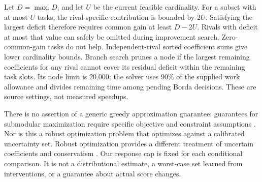 \documentclass{article}
\begin{document}
Let $D=\max_iD_i$ and let $U$ be the current feasible cardinality. For a subset with at most $U$ tasks, the rival-specific contribution is bounded by $2U$. Satisfying the largest deficit therefore requires common gain at least $D-2U$. Rivals with deficit at most that value can safely be omitted during improvement search. Zero-common-gain tasks do not help. Independent-rival sorted coefficient sums give lower cardinality bounds. Branch search prunes a node if the largest remaining coefficients for any rival cannot cover its residual deficit within the remaining task slots. Its node limit is 20,000; the solver uses 90\% of the supplied work allowance and divides remaining time among pending Borda decisions. These are source settings, not measured speedups.

There is no assertion of a generic greedy approximation guarantee: guarantees for submodular maximization require specific objective and constraint assumptions \citep{Nemhauser1978Submodular}. Nor is this a robust optimization problem that optimizes against a calibrated uncertainty set. Robust optimization provides a different treatment of uncertain coefficients and conservatism \citep{BenTal1998Robust,Bertsimas2004Price,Bertsimas2011Theory}. Our response cap is fixed for each conditional comparison. It is not a distributional estimate, a worst-case set learned from interventions, or a guarantee about actual score changes.
\end{document}
